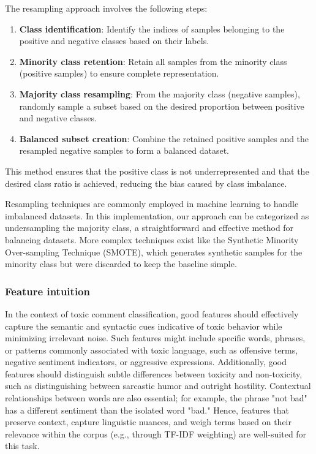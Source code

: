 The resampling approach involves the following steps:
\begin{enumerate}
    \item \textbf{Class identification}: Identify the indices of samples belonging to the positive and negative classes based on their labels.
    \item \textbf{Minority class retention}: Retain all samples from the minority class (positive samples) to ensure complete representation.
    \item \textbf{Majority class resampling}: From the majority class (negative samples), randomly sample a subset based on the desired proportion between positive and negative classes.
    \item \textbf{Balanced subset creation}: Combine the retained positive samples and the resampled negative samples to form a balanced dataset.
\end{enumerate}

This method ensures that the positive class is not underrepresented and that the desired class ratio is achieved, reducing the bias caused by class imbalance.

Resampling techniques are commonly employed in machine learning to handle imbalanced datasets. In this implementation, our approach can be categorized as undersampling the majority class, a straightforward and effective method for balancing datasets. More complex techniques exist like the Synthetic Minority Over-sampling Technique (SMOTE), which generates synthetic samples for the minority class but were discarded to keep the baseline simple. \cite{Chawla2002}

\subsubsection{Feature intuition}
In the context of toxic comment classification, good features should effectively capture the semantic and syntactic cues indicative of toxic behavior while minimizing irrelevant noise. Such features might include specific words, phrases, or patterns commonly associated with toxic language, such as offensive terms, negative sentiment indicators, or aggressive expressions. Additionally, good features should distinguish subtle differences between toxicity and non-toxicity, such as distinguishing between sarcastic humor and outright hostility. Contextual relationships between words are also essential; for example, the phrase "not bad" has a different sentiment than the isolated word "bad." Hence, features that preserve context, capture linguistic nuances, and weigh terms based on their relevance within the corpus (e.g., through TF-IDF weighting) are well-suited for this task.

